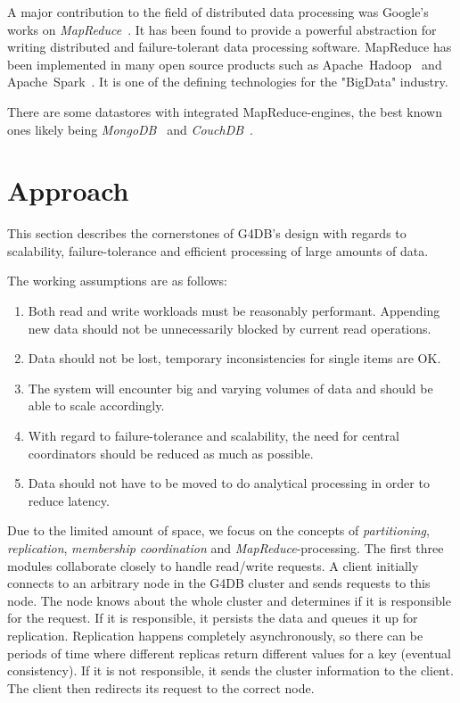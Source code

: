A major contribution to the field of distributed data processing was
Google's works on \emph{MapReduce}~\cite[]{Dean2008}.
It has been found to provide a powerful abstraction for writing
distributed and failure-tolerant data processing software.
MapReduce has been implemented in many open source products such as
Apache~Hadoop~\cite[]{Hadoop} and Apache~Spark~\cite[]{Zaharia2014}.
It is one of the defining technologies for the "BigData" industry.

There are some datastores with integrated MapReduce-engines, the best
known ones likely being \emph{MongoDB}~\cite[]{MongoDB} and \emph{CouchDB}~\cite[]{CouchDB}.    

\section{Approach}
\label{sec:approach}

This section describes the cornerstones of G4DB's design with regards to
scalability, failure-tolerance and efficient processing of large amounts
of data.

The working assumptions are as follows:
\begin{enumerate}
	\item Both read and write workloads must be reasonably performant.
		Appending new data should not be unnecessarily blocked by
		current read operations.
	\item Data should not be lost, temporary inconsistencies for single items are
		OK.
	\item The system will encounter big and varying volumes of data and should
		be able to scale accordingly.
	\item With regard to failure-tolerance and scalability, the need for
		central coordinators should be reduced as much as possible.
	\item Data should not have to be moved to do analytical processing
		in order to reduce latency.
\end{enumerate}

Due to the limited amount of space, we focus on the concepts of \emph{partitioning},
\emph{replication}, \emph{membership coordination} and \emph{MapReduce}-processing.   
The first three modules collaborate closely to handle read/write requests.
A client initially connects to an arbitrary node in the G4DB cluster and
sends requests to this node.
The node knows about the whole cluster and determines if it is responsible for the
request.
If it is responsible, it persists the data and queues it up for replication.
Replication happens completely asynchronously, so there can be periods of time
where different replicas return different values for a key (eventual consistency).
If it is not responsible, it sends the cluster information to the client.
The client then redirects its request to the correct node.


